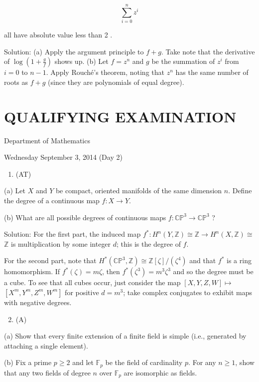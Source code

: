 \documentclass[10pt]{article}
\begin{document}
$$
\sum_{i=0}^{n} z^{i}
$$

all have absolute value less than 2 .

Solution: (a) Apply the argument principle to $f+g$. Take note that the derivative of $\log \left(1+\frac{g}{f}\right)$ shows up. (b) Let $f=z^{n}$ and $g$ be the summation of $z^{i}$ from $i=0$ to $n-1$. Apply Rouché's theorem, noting that $z^{n}$ has the same number of roots as $f+g$ (since they are polynomials of equal degree).

\section*{QUALIFYING EXAMINATION }
Department of Mathematics

Wednesday September 3, 2014 (Day 2)

\begin{enumerate}
  \item (AT)
\end{enumerate}

(a) Let $X$ and $Y$ be compact, oriented manifolds of the same dimension $n$. Define the degree of a continuous map $f: X \rightarrow Y$.

(b) What are all possible degrees of continuous maps $f: \mathbb{C P}^{3} \rightarrow \mathbb{C P}^{3}$ ?

Solution: For the first part, the induced map $f^{*}: H^{n}(Y, \mathbb{Z}) \cong \mathbb{Z} \rightarrow H^{n}(X, \mathbb{Z}) \cong$ $\mathbb{Z}$ is multiplication by some integer $d$; this is the degree of $f$.

For the second part, note that $H^{*}\left(\mathbb{C P}^{3}, \mathbb{Z}\right) \cong \mathbb{Z}[\zeta] /\left(\zeta^{4}\right)$ and that $f^{*}$ is a ring homomorphism. If $f^{*}(\zeta)=m \zeta$, then $f^{*}\left(\zeta^{3}\right)=m^{3} \zeta^{3}$ and so the degree must be a cube. To see that all cubes occur, just consider the map $[X, Y, Z, W] \mapsto$ $\left[X^{m}, Y^{m}, Z^{m}, W^{m}\right]$ for positive $d=m^{3}$; take complex conjugates to exhibit maps with negative degrees.

\begin{enumerate}
  \setcounter{enumi}{1}
  \item (A)
\end{enumerate}

(a) Show that every finite extension of a finite field is simple (i.e., generated by attaching a single element).

(b) Fix a prime $p \geq 2$ and let $\mathbb{F}_{p}$ be the field of cardinality $p$. For any $n \geq 1$, show that any two fields of degree $n$ over $\mathbb{F}_{p}$ are isomorphic as fields.
\end{document}
